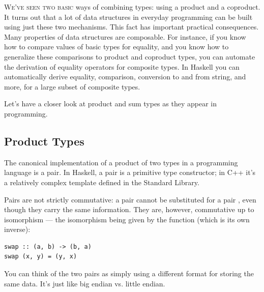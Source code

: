 \lettrine[lhang=0.17]{W}{e've seen two basic} ways of combining types: using a product and a
coproduct. It turns out that a lot of data structures in everyday
programming can be built using just these two mechanisms. This fact has
important practical consequences. Many properties of data structures are
composable. For instance, if you know how to compare values of basic
types for equality, and you know how to generalize these comparisons to
product and coproduct types, you can automate the derivation of equality
operators for composite types. In Haskell you can automatically derive
equality, comparison, conversion to and from string, and more, for a
large subset of composite types.

Let's have a closer look at product and sum types as they appear in
programming.

\subsection{Product Types}\label{product-types}

The canonical implementation of a product of two types in a programming
language is a pair. In Haskell, a pair is a primitive type constructor;
in C++ it's a relatively complex template defined in the Standard
Library.

\begin{figure}
  \centering
\end{figure}

\noindent
Pairs are not strictly commutative: a pair  cannot
be substituted for a pair , even though they carry
the same information. They are, however, commutative up to isomorphism
--- the isomorphism being given by the  function (which is
its own inverse):

\begin{verbatim}
swap :: (a, b) -> (b, a)
swap (x, y) = (y, x)
\end{verbatim}

\noindent
You can think of the two pairs as simply using a different format for
storing the same data. It's just like big endian vs. little endian.

